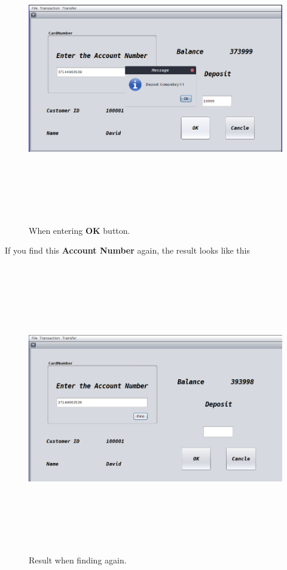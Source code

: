 \documentclass[12pt,a4paper]{article}
\begin{document}
\begin{figure}[H]
        \centering
        \includegraphics[width=5.5in,height=5in]{Picture/deposit.png}
        \caption{When entering \textbf{OK} button.}
    \end{figure}
\newpage
\indent If you find this \textbf{Account Number} again, the result looks like this

\begin{figure}[H]
        \centering
        \includegraphics[width=5.5in,height=5in]{Picture/findagain.png}
        \caption{Result when finding again.}
    \end{figure}
\end{document}

